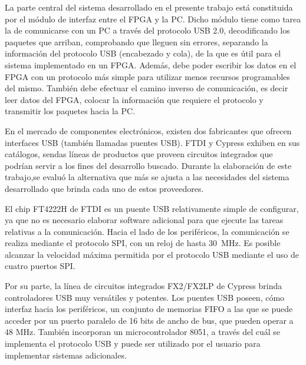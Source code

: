 La parte central del sistema desarrollado en el presente trabajo está constituida por el módulo de interfaz entre el FPGA y la PC. Dicho módulo tiene como tarea la de comunicarse con un PC a través del protocolo USB 2.0, decodificando los paquetes que arriban, comprobando que lleguen sin errores, separando la información del protocolo USB (encabezado y cola), de la que es útil para el sistema implementado en un FPGA. Además, debe poder escribir los datos en el FPGA con un protocolo más simple para utilizar menos recursos programables del mismo. También debe efectuar el camino inverso de comunicación, es decir leer datos del FPGA, colocar la información que requiere el protocolo y transmitir los paquetes hacia la PC.%

En el mercado de componentes electrónicos, existen dos fabricantes que ofrecen interfaces USB (también llamadas puentes USB). FTDI y Cypress exhiben en sus catálogos, sendas líneas de productos que proveen circuitos integrados que podrían servir a los fines del desarrollo buscado. Durante la elaboración de este trabajo,se evaluó la alternativa que más se ajusta a las necesidades del sistema desarrollado que brinda cada uno de estos proveedores.

El chip FT4222H de FTDI es un puente USB relativamente simple de configurar, ya que no es necesario elaborar software adicional para que ejecute las tareas relativas a la comunicación. Hacia el lado de los periféricos, la comunicación se realiza mediante el protocolo SPI, con un reloj de hasta \SI{30}{\mega\hertz}. Es posible alcanzar la velocidad máxima permitida por el protocolo USB mediante el uso de cuatro puertos SPI.%

Por su parte, la línea de circuitos integrados FX2/FX2LP de Cypress brinda controladores USB muy versátiles y potentes. Los puentes USB poseen, cómo interfaz hacia los periféricos, un conjunto de memorias FIFO a las que se puede acceder por un puerto paralelo de 16 bits de ancho de bus, que pueden operar a 48 MHz. También incorporan un microcontrolador 8051, a través del cuál se implementa el protocolo USB y puede ser utilizado por el usuario para implementar sistemas adicionales.

